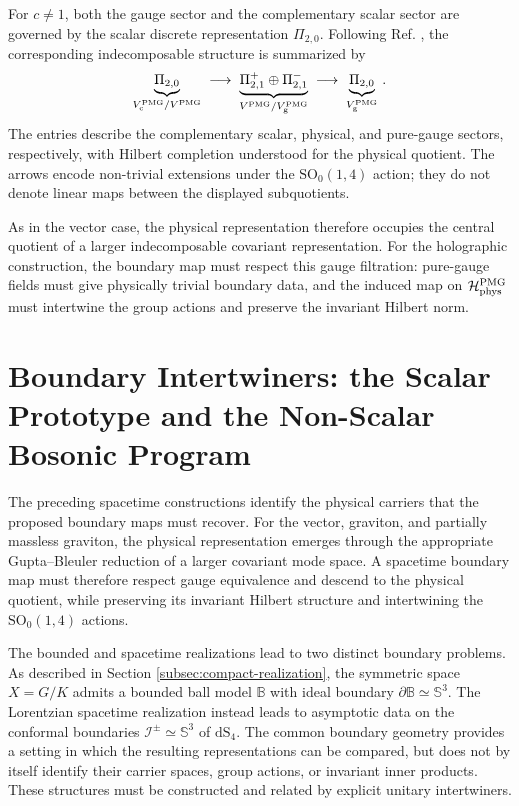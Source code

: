 \documentclass{SciPost}
\begin{document}
For $c\neq1$, both the gauge sector and the complementary scalar sector are governed by the scalar discrete representation $\Pi_{2,0}$. Following Ref. \cite{GravPartially}, the corresponding indecomposable structure is summarized by
\begin{align}\label{eq:PM-indecomposable}
    \underbrace{\Pi_{2,0}}_{
        V_{\rm c}^{\rm PMG}/V^{\rm PMG}}
    \;\longrightarrow\;
    \underbrace{\Pi^+_{2,1}\oplus\Pi^-_{2,1}}_{
        V^{\rm PMG}/V_{\rm g}^{\rm PMG}}
    \;\longrightarrow\;
    \underbrace{\Pi_{2,0}}_{
        V_{\rm g}^{\rm PMG}} \,.
\end{align}
The entries describe the complementary scalar, physical, and pure-gauge sectors, respectively, with Hilbert completion understood for the physical quotient. The arrows encode non-trivial extensions under the $\mathrm{SO}_0(1,4)$ action; they do not denote linear maps between the displayed subquotients.

As in the vector case, the physical representation therefore occupies the central quotient of a larger indecomposable covariant representation. For the holographic construction, the boundary map must respect this gauge filtration: pure-gauge fields must give physically trivial boundary data, and the induced map on ${\cal H}_{\rm phys}^{\rm PMG}$ must intertwine the group actions and preserve the invariant Hilbert norm.


\section{Boundary Intertwiners: the Scalar Prototype and the Non-Scalar Bosonic Program} \label{subsec:compact-to-boundary}

The preceding spacetime constructions identify the physical carriers that the proposed boundary maps must recover. For the vector, graviton, and partially massless graviton, the physical representation emerges through the appropriate Gupta--Bleuler reduction of a larger covariant mode space. A spacetime boundary map must therefore respect gauge equivalence and descend to the physical quotient, while preserving its invariant Hilbert structure and intertwining the $\mathrm{SO}_0(1,4)$ actions.

The bounded and spacetime realizations lead to two distinct boundary problems. As described in Section \ref{subsec:compact-realization}, the symmetric space $X=G/K$ admits a bounded ball model $\mathbb B$ with ideal boundary $\partial\mathbb B\simeq\mathbb S^3$. The Lorentzian spacetime realization instead leads to asymptotic data on the conformal boundaries $\mathscr I^\pm\simeq\mathbb S^3$ of $\mathrm{dS}_4$. The common boundary geometry provides a setting in which the resulting representations can be compared, but does not by itself identify their carrier spaces, group actions, or invariant inner products. These structures must be constructed and related by explicit unitary intertwiners. 
\end{document}
